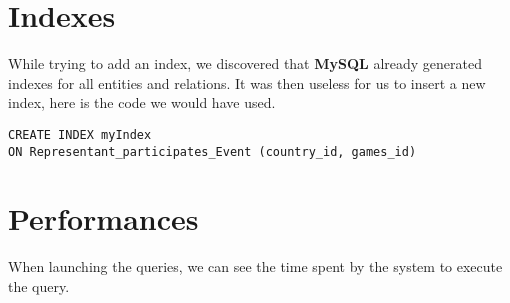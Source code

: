 \begin{center}
	
\end{center}

\begin{center}
	
\end{center}

\begin{center}
	
\end{center}

\section{Indexes}
While trying to add an index, we discovered that \textbf{MySQL} already generated indexes for all entities and relations.
It was then useless for us to insert a new index, here is the code we would have used.

\begin{lstlisting}[caption={Index creation}]
CREATE INDEX myIndex
ON Representant_participates_Event (country_id, games_id)
\end{lstlisting}


\section{Performances}
When launching the queries, we can see the time spent by the system to execute the query.

